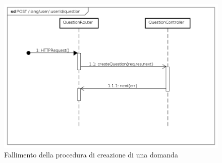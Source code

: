 \begin{itemize}
\begin{figure}[ht]
	\centering
	\includegraphics[scale=0.45]{UML/DiagrammiDiSequenza/Back-end/POST__lang_user__userId_question_failure.png}
	\caption{Fallimento della procedura di creazione di una domanda}
\end{figure}
\FloatBarrier

\end{itemize}
